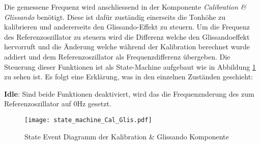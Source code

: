 Die gemessene Frequenz wird anschliessend in der Komponente \textit{Calibration \& Glissando} benötigt. Diese ist dafür zuständig einerseits die Tonhöhe zu kalibrieren und andererseits den Glissando-Effekt zu steuern. Um die Frequenz des Referenzoszillator zu steuern wird die Differenz welche den Glissandoeffekt hervorruft und die Änderung welche während der Kalibration berechnet wurde addiert und dem Referenzoszillator als Frequenzdifferenz übergeben. Die Steuerung dieser Funktionen ist als State-Machine aufgebaut wie in Abbildung \ref{img:state_event_Cal_Glis} zu sehen ist. Es folgt eine Erklärung, was in den einzelnen Zuständen geschieht:

\textbf{Idle}:
Sind beide Funktionen deaktiviert, wird das die Frequenznderung des  zum Referenzoszillator auf 0Hz gesetzt.

\begin{figure}[h!]
	\centering
	\texttt{[image: state\_machine\_Cal\_Glis.pdf]}
	\caption{State Event Diagramm der Kalibration \& Glissando Komponente} 
	\label{img:state_event_Cal_Glis}
\end{figure} 